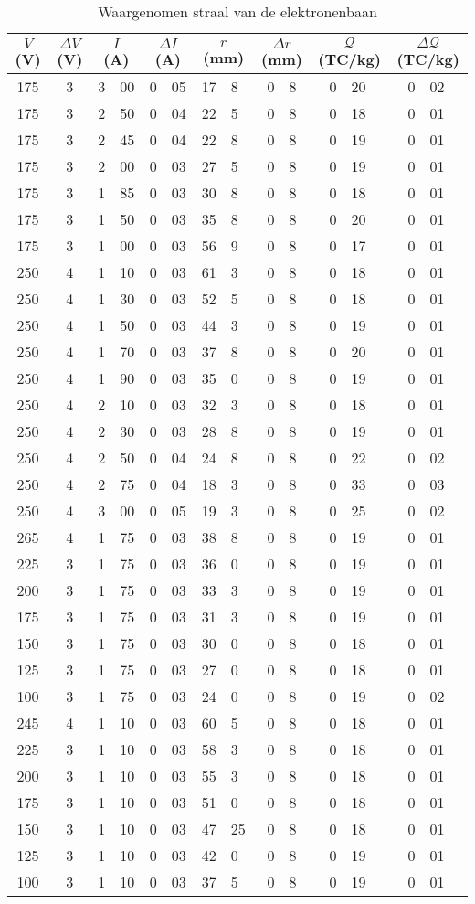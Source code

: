 \begin{table}
\caption{Waargenomen straal van de elektronenbaan}
\label{tabel-elektron}
\begin{center}
\begin{tabular}{c|c|r@{.}l|r@{.}l|r@{.}l|r@{.}l|r@{.}l|r@{.}l}
\multicolumn{1}{c|}{$V$ (V)}&
\multicolumn{1}{c|}{$\Delta V$ (V)}&
\multicolumn{2}{c|}{$I$ (A)}&
\multicolumn{2}{c|}{$\Delta I$ (A)}&
\multicolumn{2}{c|}{$r$ (mm)}&
\multicolumn{2}{c|}{$\Delta r$ (mm)}&
\multicolumn{2}{c|}{$\mathcal{Q}$ (TC/kg)}&
\multicolumn{2}{c}{$\Delta \mathcal{Q}$ (TC/kg)}\\\hline
175&	3&	3&00&	0&05&	17&8&	0&8&	0&20&	0&02\\
175&	3&	2&50&	0&04&	22&5&	0&8&	0&18&	0&01\\
175&	3&	2&45&	0&04&	22&8&	0&8&	0&19&	0&01\\
175&	3&	2&00&	0&03&	27&5&	0&8&	0&19&	0&01\\
175&	3&	1&85&	0&03&	30&8&	0&8&	0&18&	0&01\\
175&	3&	1&50&	0&03&	35&8&	0&8&	0&20&	0&01\\
175&	3&	1&00&	0&03&	56&9&	0&8&	0&17&	0&01\\
250&	4&	1&10&	0&03&	61&3&	0&8&	0&18&	0&01\\
250&	4&	1&30&	0&03&	52&5&	0&8&	0&18&	0&01\\
250&	4&	1&50&	0&03&	44&3&	0&8&	0&19&	0&01\\
250&	4&	1&70&	0&03&	37&8&	0&8&	0&20&	0&01\\
250&	4&	1&90&	0&03&	35&0&	0&8&	0&19&	0&01\\
250&	4&	2&10&	0&03&	32&3&	0&8&	0&18&	0&01\\
250&	4&	2&30&	0&03&	28&8&	0&8&	0&19&	0&01\\
250&	4&	2&50&	0&04&	24&8&	0&8&	0&22&	0&02\\
250&	4&	2&75&	0&04&	18&3&	0&8&	0&33&	0&03\\
250&	4&	3&00&	0&05&	19&3&	0&8&	0&25&	0&02\\
265&	4&	1&75&	0&03&	38&8&	0&8&	0&19&	0&01\\
225&	3&	1&75&	0&03&	36&0&	0&8&	0&19&	0&01\\
200&	3&	1&75&	0&03&	33&3&	0&8&	0&19&	0&01\\
175&	3&	1&75&	0&03&	31&3&	0&8&	0&19&	0&01\\
150&	3&	1&75&	0&03&	30&0&	0&8&	0&18&	0&01\\
125&	3&	1&75&	0&03&	27&0&	0&8&	0&18&	0&01\\
100&	3&	1&75&	0&03&	24&0&	0&8&	0&19&	0&02\\
245&	4&	1&10&	0&03&	60&5&	0&8&	0&18&	0&01\\
225&	3&	1&10&	0&03&	58&3&	0&8&	0&18&	0&01\\
200&	3&	1&10&	0&03&	55&3&	0&8&	0&18&	0&01\\
175&	3&	1&10&	0&03&	51&0&	0&8&	0&18&	0&01\\
150&	3&	1&10&	0&03&	47&25&	0&8&	0&18&	0&01\\
125&	3&	1&10&	0&03&	42&0&	0&8&	0&19&	0&01\\
100&	3&	1&10&	0&03&	37&5&	0&8&	0&19&	0&01\\
\end{tabular}
\end{center}
\end{table}
